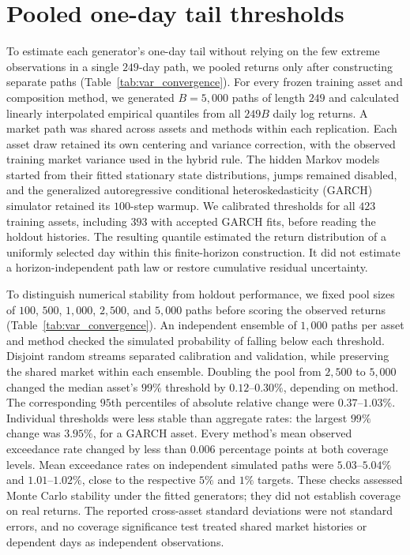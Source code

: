 \clearpage
\section{Pooled one-day tail thresholds}
\label{sec:supp-var-ensemble}

To estimate each generator's one-day tail without relying on the few
extreme observations in a single $249$-day path, we pooled returns
only after constructing separate paths
(Table~\ref{tab:var_convergence}). For every frozen training
asset and composition method, we generated $B=5{,}000$ paths of
length $249$ and calculated linearly interpolated empirical quantiles
from all $249B$ daily log returns. A market path was shared across
assets and methods within each replication. Each asset draw retained
its own centering and variance correction, with the observed training
market variance used in the hybrid rule. The hidden Markov models
started from their fitted stationary state distributions, jumps
remained disabled, and the generalized autoregressive conditional
heteroskedasticity (GARCH) simulator retained its $100$-step warmup.
We calibrated thresholds for all $423$ training assets, including
$393$ with accepted GARCH fits, before reading the holdout histories.
The resulting quantile estimated the return distribution of a
uniformly selected day within this finite-horizon construction.
It did not estimate a horizon-independent path law or restore
cumulative residual uncertainty.

To distinguish numerical stability from holdout performance, we fixed
pool sizes of $100$, $500$, $1{,}000$, $2{,}500$, and $5{,}000$ paths
before scoring the observed returns
(Table~\ref{tab:var_convergence}). An independent ensemble of
$1{,}000$ paths per asset and method checked the simulated probability
of falling below each threshold. Disjoint random streams separated
calibration and validation, while preserving the shared market within
each ensemble. Doubling the pool from $2{,}500$ to $5{,}000$ changed
the median asset's $99\%$ threshold by $0.12$--$0.30\%$, depending
on method. The corresponding $95$th percentiles of absolute relative
change were $0.37$--$1.03\%$. Individual thresholds were less stable
than aggregate rates: the largest $99\%$ change was $3.95\%$, for a
GARCH asset. Every method's mean observed exceedance rate changed by
less than $0.006$ percentage points at both coverage levels. Mean
exceedance rates on independent simulated paths were
$5.03$--$5.04\%$ and $1.01$--$1.02\%$, close to the respective
$5\%$ and $1\%$ targets. These checks assessed Monte Carlo stability
under the fitted generators; they did not establish coverage on real
returns. The reported cross-asset standard deviations were not
standard errors, and no coverage significance test treated shared
market histories or dependent days as independent observations.

